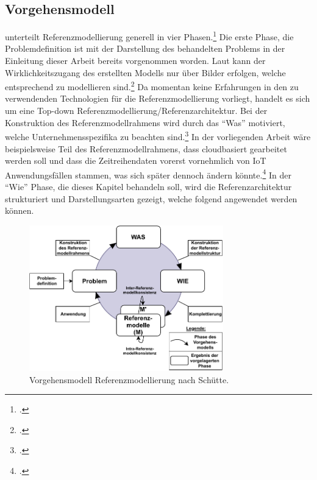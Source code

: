 \subsection{Vorgehensmodell}

\citeauthor{Schutte.1998} unterteilt Referenzmodellierung generell in vier Phasen.\footcite[Vgl. auch im Folgenden][184\psq]{Schutte.1998} Die erste Phase, die Problemdefinition ist mit der Darstellung des behandelten Problems in der Einleitung dieser Arbeit bereits vorgenommen worden. Laut \citeauthor{Schutte.1998} kann der Wirklichkeitszugang des erstellten Modells nur über Bilder erfolgen, welche entsprechend zu modellieren sind.\footcite[Vgl. auch im Folgenden][185\psq]{Schutte.1998} Da momentan keine Erfahrungen in den zu verwendenden Technologien für die Referenzmodellierung vorliegt, handelt es sich um eine Top-down Referenzmodellierung/Referenzarchitektur. Bei der Konstruktion des Referenzmodellrahmens wird durch das \enquote{Was} motiviert, welche Unternehmensspezifika zu beachten sind.\footcite[Vgl. auch im Folgenden][186]{Schutte.1998} In der vorliegenden Arbeit wäre beispielsweise Teil des Referenzmodellrahmens, dass cloudbasiert gearbeitet werden soll und dass die Zeitreihendaten vorerst vornehmlich von \ac{IoT} Anwendungsfällen stammen, was sich später dennoch ändern könnte.\footcite[Vgl. auch im Folgenden][187\psq]{Schutte.1998} In der \enquote{Wie} Phase, die dieses Kapitel behandeln soll, wird die Referenzarchitektur strukturiert und Darstellungsarten gezeigt, welche folgend angewendet werden können. 

\begin{figure}[H]
\centering
\includegraphics[width=0.75\textwidth]{graphics/Vorgehen-Referenzmodellierung.pdf}
\caption[Vorgehensmodell Referenzmodellierung nach Schütte]{Vorgehensmodell Referenzmodellierung nach Schütte.\footnotemark}
\label{abb:VorgehensmodellReferenzmodellierung}
\end{figure}




